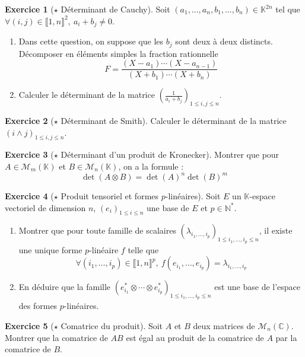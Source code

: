 \documentclass[french]{book}
\newcommand{\N}{\mathbb{N}}
\newcommand{\C}{\mathbb{C}}
\newcommand{\K}{\mathbb{K}}
\newcommand{\st}{^*}
\theoremstyle{definition}
\newtheorem{ex}{Exercice}[chapter]
\theoremstyle{theorem}
\theoremstyle{remark}
\begin{document}
\begin{ex}[$\star$ Déterminant de Cauchy]
	Soit $(a_1,\ldots,a_n,b_1,\ldots,b_n)\in\K^{2n}$ tel que $\forall (i,j)\in\llbracket1,n\rrbracket^2,\ a_i+b_j\ne 0$.
	\begin{enumerate}
		\item Dans cette question, on suppose que les $b_j $ sont deux à deux distincts. Décomposer en éléments simples la fraction rationnelle $$F=\frac{(X-a_1)\cdots(X-a_{n-1})}{(X+b_1)\cdots(X+b_n)}$$
		\item Calculer le déterminant de la matrice $\displaystyle\left(\frac{1}{a_i+b_j}\right)_{1\leqslant i,j\leqslant n}$.
	\end{enumerate}
\end{ex}

\begin{ex}[$\star$ Déterminant de Smith]
	Calculer le déterminant de la matrice $(i\wedge j)_{1\leqslant i,j\leqslant n}$.
\end{ex}

\begin{ex}[$\star$ Déterminant d'un produit de Kronecker] Montrer que pour $A\in\mathcal{M}_m(\K)$ et $B\in\mathcal{M}_n(\K)$, on a la formule : $$\det(A\otimes B)=\det(A)^n\det(B)^m$$ 
\end{ex}

\begin{ex}[$\star$ Produit tensoriel et formes $p$-linéaires]
	Soit $E$ un $\K$-espace vectoriel de dimension $n$, $(e_i)_{1\leqslant i\leqslant n}$ une base de $E$ et $p\in\N\st$.
	\begin{enumerate}
		\item Montrer que pour toute famille de scalaires $(\lambda_{i_1,\ldots,i_p})_{1\leqslant i_1,\ldots,i_p\leqslant n}$, il existe une unique forme $p$-linéaire $f$ telle que $$\forall (i_1,\ldots,i_p)\in\llbracket1,n\rrbracket^p,\ f(e_{i_1},\ldots,e_{i_p})=\lambda_{i_1,\ldots,i_p}$$
		\item En déduire que la famille $(e_{i_1}\st\otimes\cdots\otimes e_{i_p}\st)_{1\leqslant i_1,\ldots,i_p\leqslant n}$ est une base de l'espace des formes $p$-linéaires.
	\end{enumerate}
\end{ex}

\begin{ex}[$\star$ Comatrice du produit]
	Soit $A$ et $B$ deux matrices de $\mathcal{M}_n(\C)$. Montrer que la comatrice de $AB$ est égal au produit de la comatrice de $A$ par la comatrice de $B$.
\end{ex}
\end{document}
